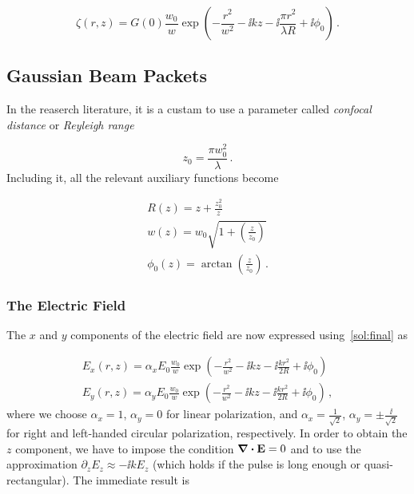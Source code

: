 \documentclass[12pt, class=report, crop=false]{standalone}
\begin{document}
\begin{equation}
  \label{sol:final}
  \zeta(r,z) = G(0)\frac{w_0}{w} \exp(-\frac{r^2}{w^2}  -\ii k z -\ii \frac{\pi r^2}{\lambda R} + \ii \phi_0)\,.
\end{equation}

\subsection{Gaussian Beam Packets}

In the reaserch literature, it is a custam to use a parameter called \textit{confocal distance} or \textit{Reyleigh range}

\begin{equation}
  z_0=\frac{\pi w_0^2}{\lambda} \,.
\end{equation}
Including it, all the relevant auxiliary functions become

\begin{subequations}
  \begin{align}
    R(z) = z+\frac{z_0^2}{z} \\
    w(z) = w_0 \sqrt{1+\left( \frac{z}{z_0}\right)}\\
    \phi_0 (z) = \arctan(\frac{z}{z_0}) \,.
  \end{align}
\end{subequations}

\subsubsection{The Electric Field}
The \(x\) and \(y\) components of the electric field are now expressed using~\cref{sol:final} as

\begin{subequations}
  \begin{align}
    E_x (r,z) = \alpha_x E_0 \frac{w_0}{w} \exp(-\frac{r^2}{w^2}  -\ii k z -\ii \frac{k r^2}{2 R} + \ii \phi_0)\\
    E_y (r,z) = \alpha_y E_0 \frac{w_0}{w} \exp(-\frac{r^2}{w^2}  -\ii k z -\ii \frac{k r^2}{2 R} + \ii \phi_0)\,,
  \end{align}
\end{subequations}
where we choose \(\alpha_x=1\), \(\alpha_y=0\) for linear polarization, and \(\alpha_x=\frac{1}{\sqrt{2}}\), \(\alpha_y=\pm \frac{\ii}{\sqrt{2}}\) for right and left-handed circular polarization, respectively. In order to obtain the \(z\) component, we have to impose the condition \(\div{\vb{E}} = 0\) and to use the approximation \(\partial_z E_z \approx -\ii k E_z\) (which holds if the pulse is long enough or quasi-rectangular). The immediate result is
\end{document}
